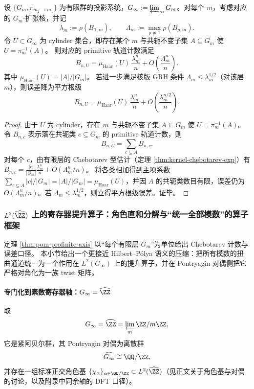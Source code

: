 \begin{theorem}\label{thm:pom-profinite-axis}
设 $\{G_m,\pi_{m_2\to m_1}\}$ 为有限群的投影系统，$G_\infty:=\varprojlim_m G_m$。对每个 $m$，考虑对应的 $G_m$-扩张核，并记
$$
\lambda_m:=\rho(B_{\mathbf 1,m}),\qquad
\Lambda_m:=\max_{\rho\neq\mathbf 1}\rho(B_{\rho,m}).
$$
令 \(U\subset G_\infty\) 为 cylinder 集合，即存在某个 $m$ 与共轭不变子集 $A\subseteq G_m$ 使
\(
U=\pi_m^{-1}(A)
\)。
则对应的 primitive 轨道计数满足
$$
B_{n,U}
=\mu_{\mathrm{Haar}}(U)\,\frac{\lambda_m^n}{n}
 +O\!\left(\frac{\Lambda_m^n}{n}\right).
$$
其中 \(\mu_{\mathrm{Haar}}(U)=|A|/|G_m|\)。
若进一步满足核版 GRH 条件 $\Lambda_m\le \lambda_m^{1/2}$（对该层 $m$），则误差降为平方根级
$$
B_{n,U}
=\mu_{\mathrm{Haar}}(U)\,\frac{\lambda_m^n}{n}
 +O\!\left(\frac{\lambda_m^{n/2}}{n}\right).
$$
\end{theorem}
\begin{proof}
由于 $U$ 为 cylinder，存在 $m$ 与共轭不变子集 $A\subseteq G_m$ 使 $U=\pi_m^{-1}(A)$。令 $B_{n,c}$ 表示落在共轭类 $c\subseteq G_m$ 的 primitive 轨道计数，则
$$
B_{n,U}=\sum_{c\subseteq A} B_{n,c}.
$$
对每个 $c$，由有限层的 Chebotarev 型估计（定理 \ref{thm:kernel-chebotarev-exp}）有
$
B_{n,c}=\frac{|c|}{|G_m|}\frac{\lambda_m^n}{n}+O(\Lambda_m^n/n)
$。
将各类相加得到主项系数
$
\sum_{c\subseteq A}|c|/|G_m|=|A|/|G_m|=\mu_{\mathrm{Haar}}(U)
$，并因 $A$ 的共轭类数目有限，误差仍为 $O(\Lambda_m^n/n)$。若 $\Lambda_m\le \lambda_m^{1/2}$，则立得平方根级误差。证毕。
\end{proof}

\subsubsection{\texorpdfstring{$L^2(\widehat{\ZZ})$}{L2(Zhat)} 上的寄存器提升算子：角色直和分解与“统一全部模数”的算子框架}\label{subsec:profinite-operator-l2}
定理 \ref{thm:pom-profinite-axis} 以“每个有限层 \(G_m\)”为单位给出 Chebotarev 计数与误差口径。
本小节给出一个更接近 Hilbert--P{\'o}lya 语义的压缩：把所有模数的扭曲通道统一为一个作用在 \(L^2(G_\infty)\) 上的提升算子，并在 Pontryagin 对偶侧把它严格对角化为一族 twist 矩阵。

\paragraph{专门化到素数寄存器轴：\texorpdfstring{$G_\infty=\widehat{\ZZ}$}{G=Zhat}}
取
\[
G_\infty=\widehat{\ZZ}=\varprojlim_m \ZZ/m\ZZ,
\]
它是紧阿贝尔群，其 Pontryagin 对偶为离散群
\[
\widehat{G_\infty}\cong \QQ/\ZZ,
\]
并存在一组标准正交角色基 \(\{\chi_\alpha\}_{\alpha\in\QQ/\ZZ}\subset L^2(\widehat{\ZZ})\)（见正文关于角色基与对偶的讨论，以及附录中同余轴的 DFT 口径）。

